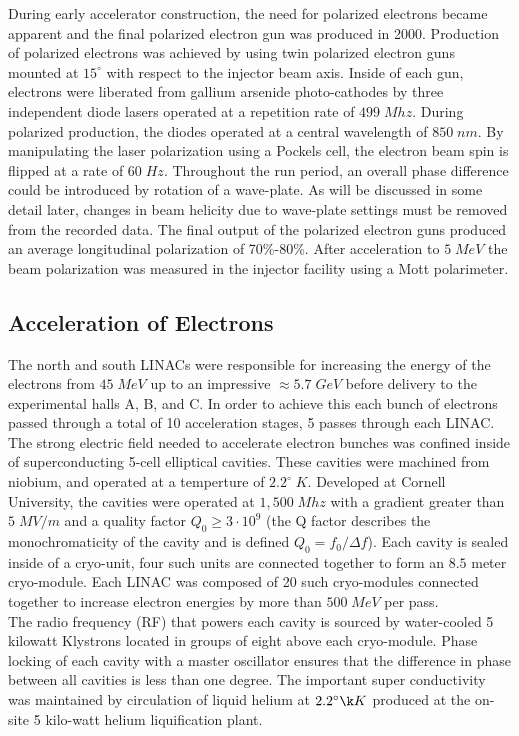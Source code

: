 During early accelerator construction, the need for polarized electrons became apparent and the final polarized electron gun was produced in 2000.  Production of polarized electrons was achieved by using twin polarized electron guns mounted at $15^\circ$ with respect to the injector beam axis.  Inside of each gun, electrons were liberated from gallium arsenide photo-cathodes by three independent diode lasers operated at a repetition rate of $499 \; Mhz$.  During polarized production, the diodes operated at a central wavelength of $850 \; nm$.  By manipulating the laser polarization using a Pockels cell, the electron  beam spin is flipped at a rate of $60 \; Hz$.  Throughout the run period, an overall phase difference could be introduced by rotation of a wave-plate.  As will be discussed in some detail later, changes in beam helicity due to wave-plate settings must be removed from the recorded data.  The final output of the polarized electron guns produced an average longitudinal polarization of 70\%-80\%.  After acceleration to $5 \; MeV$ the beam polarization was measured in the injector facility using a Mott polarimeter. \\

\subsection{Acceleration of Electrons}    
The north and south LINACs were responsible for increasing the energy of the electrons from $45 \; MeV$ up to an impressive $\approx 5.7 \; GeV$ before delivery to the experimental halls A, B, and C.  In order to achieve this each bunch of electrons passed through a total of 10 acceleration stages, 5 passes through each LINAC.  The strong electric field needed to accelerate electron bunches was confined inside of superconducting 5-cell elliptical cavities.  These cavities were machined from niobium, and operated at a temperture of $2.2^\circ \; K$.  Developed at Cornell University, the cavities were operated at $1,500 \; Mhz$ with a gradient greater than $5 \; MV/m$ and a quality factor $Q_0 \geq 3 \cdot 10^9$ (the Q factor describes the monochromaticity of the cavity and is defined $Q_0 = f_0/\Delta f$).  Each cavity is sealed inside of a cryo-unit, four such units are connected together to form an $8.5$ meter cryo-module.  Each LINAC was composed of 20 such cryo-modules connected together to increase electron energies by more than $500 \; MeV$ per pass.\\

The radio frequency (RF) that powers each cavity is sourced by water-cooled 5 kilowatt Klystrons located in groups of eight above each cryo-module.  Phase locking of each cavity with a master oscillator ensures that the difference in phase between all cavities is less than one degree. The important super conductivity was maintained by circulation of liquid helium at $2.2^\circ \k K$ produced at the on-site 5 kilo-watt helium liquification plant.  \\

